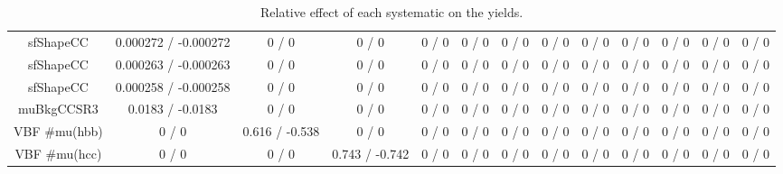 \documentclass[10pt]{article}
\begin{document}
\begin{table}[htbp]
\begin{center}
\begin{tabular}{|c|c|c|c|c|c|c|c|c|c|c|c|c|}
  sfShapeCC & 0.000272 / -0.000272 & 0 / 0 & 0 / 0 & 0 / 0 & 0 / 0 & 0 / 0 & 0 / 0 & 0 / 0 & 0 / 0 & 0 / 0 & 0 / 0 & 0 / 0 \\ 
  sfShapeCC & 0.000263 / -0.000263 & 0 / 0 & 0 / 0 & 0 / 0 & 0 / 0 & 0 / 0 & 0 / 0 & 0 / 0 & 0 / 0 & 0 / 0 & 0 / 0 & 0 / 0 \\ 
  sfShapeCC & 0.000258 / -0.000258 & 0 / 0 & 0 / 0 & 0 / 0 & 0 / 0 & 0 / 0 & 0 / 0 & 0 / 0 & 0 / 0 & 0 / 0 & 0 / 0 & 0 / 0 \\ 
  muBkgCCSR3 & 0.0183 / -0.0183 & 0 / 0 & 0 / 0 & 0 / 0 & 0 / 0 & 0 / 0 & 0 / 0 & 0 / 0 & 0 / 0 & 0 / 0 & 0 / 0 & 0 / 0 \\ 
  VBF #mu(hbb) & 0 / 0 & 0.616 / -0.538 & 0 / 0 & 0 / 0 & 0 / 0 & 0 / 0 & 0 / 0 & 0 / 0 & 0 / 0 & 0 / 0 & 0 / 0 & 0 / 0 \\ 
  VBF #mu(hcc) & 0 / 0 & 0 / 0 & 0.743 / -0.742 & 0 / 0 & 0 / 0 & 0 / 0 & 0 / 0 & 0 / 0 & 0 / 0 & 0 / 0 & 0 / 0 & 0 / 0 \\ 
\hline 
\end{tabular} 
\caption{Relative effect of each systematic on the yields.} 
\end{center} 
\end{table} 
\end{document}

